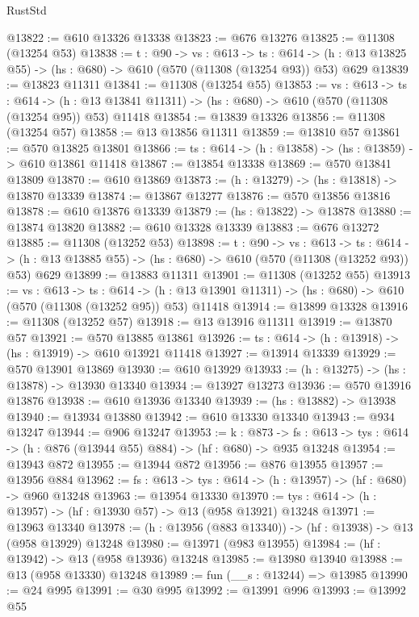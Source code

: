 \begin{lexlean}{RustStd}
\begin{coremodule}
@13822 := @610 @13326 @13338
@13823 := @676 @13276
@13825 := @11308 (@13254 @53)
@13838 := {t : @90} ->
  {vs : @613} ->
  {ts : @614} -> (h : @13 @13825 @55) -> (hs : @680) -> @610 (@570 (@11308 (@13254 @93)) @53) @629
@13839 := @13823 @11311
@13841 := @11308 (@13254 @55)
@13853 := {vs : @613} ->
  {ts : @614} ->
  (h : @13 @13841 @11311) -> (hs : @680) -> @610 (@570 (@11308 (@13254 @95)) @53) @11418
@13854 := @13839 @13326
@13856 := @11308 (@13254 @57)
@13858 := @13 @13856 @11311
@13859 := @13810 @57
@13861 := @570 @13825 @13801
@13866 := {ts : @614} -> (h : @13858) -> (hs : @13859) -> @610 @13861 @11418
@13867 := @13854 @13338
@13869 := @570 @13841 @13809
@13870 := @610 @13869
@13873 := (h : @13279) -> (hs : @13818) -> @13870 @13339
@13874 := @13867 @13277
@13876 := @570 @13856 @13816
@13878 := @610 @13876 @13339
@13879 := (hs : @13822) -> @13878
@13880 := @13874 @13820
@13882 := @610 @13328 @13339
@13883 := @676 @13272
@13885 := @11308 (@13252 @53)
@13898 := {t : @90} ->
  {vs : @613} ->
  {ts : @614} -> (h : @13 @13885 @55) -> (hs : @680) -> @610 (@570 (@11308 (@13252 @93)) @53) @629
@13899 := @13883 @11311
@13901 := @11308 (@13252 @55)
@13913 := {vs : @613} ->
  {ts : @614} ->
  (h : @13 @13901 @11311) -> (hs : @680) -> @610 (@570 (@11308 (@13252 @95)) @53) @11418
@13914 := @13899 @13328
@13916 := @11308 (@13252 @57)
@13918 := @13 @13916 @11311
@13919 := @13870 @57
@13921 := @570 @13885 @13861
@13926 := {ts : @614} -> (h : @13918) -> (hs : @13919) -> @610 @13921 @11418
@13927 := @13914 @13339
@13929 := @570 @13901 @13869
@13930 := @610 @13929
@13933 := (h : @13275) -> (hs : @13878) -> @13930 @13340
@13934 := @13927 @13273
@13936 := @570 @13916 @13876
@13938 := @610 @13936 @13340
@13939 := (hs : @13882) -> @13938
@13940 := @13934 @13880
@13942 := @610 @13330 @13340
@13943 := @934 @13247
@13944 := @906 @13247
@13953 := {k : @873} ->
  {fs : @613} -> {tys : @614} -> (h : @876 (@13944 @55) @884) -> (hf : @680) -> @935 @13248
@13954 := @13943 @872
@13955 := @13944 @872
@13956 := @876 @13955
@13957 := @13956 @884
@13962 := {fs : @613} -> {tys : @614} -> (h : @13957) -> (hf : @680) -> @960 @13248
@13963 := @13954 @13330
@13970 := {tys : @614} -> (h : @13957) -> (hf : @13930 @57) -> @13 (@958 @13921) @13248
@13971 := @13963 @13340
@13978 := (h : @13956 (@883 @13340)) -> (hf : @13938) -> @13 (@958 @13929) @13248
@13980 := @13971 (@983 @13955)
@13984 := (hf : @13942) -> @13 (@958 @13936) @13248
@13985 := @13980 @13940
@13988 := @13 (@958 @13330) @13248
@13989 := fun (__s : @13244) => @13985
@13990 := @24 @995
@13991 := @30 @995
@13992 := @13991 @996
@13993 := @13992 @55

\end{coremodule}
\end{lexlean}
